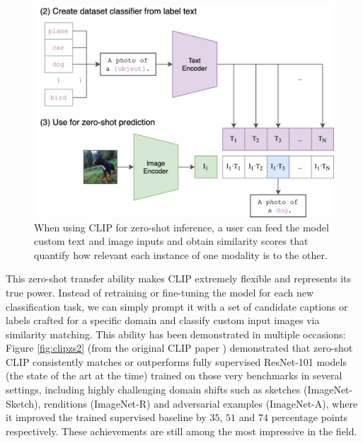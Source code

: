 \documentclass[a4paper, oneside, english]{sapthesis} %
\begin{document}
\begin{figure}[h]
    \centering
    \includegraphics[width=\textwidth]{img/CLIP-zero-shot.png}
    \caption{When using CLIP for zero-shot inference, a user can feed the model custom text and image inputs and obtain similarity scores that quantify how relevant each instance of one modality is to the other.}
    \label{fig:clipzs1}
\end{figure}

This zero-shot transfer ability makes CLIP extremely flexible and represents its true power. Instead of retraining or fine-tuning the model for each new classification task, we can simply prompt it with a set of candidate captions or labels crafted for a specific domain and classify custom input images via similarity matching. This ability has been demonstrated in multiple occasions: Figure \ref{fig:clipzs2} (from the original CLIP paper \cite{radford2021learning}) demonstrated that zero-shot CLIP consistently matches or outperforms fully supervised ResNet-101 models (the state of the art at the time) trained on those very benchmarks in several settings, including highly challenging domain shifts such as sketches (ImageNet-Sketch), renditions (ImageNet-R) and adversarial examples (ImageNet-A), where it improved the trained supervised baseline by $35$, $51$ and $74$ percentage points respectively. These achievements are still among the most impressive in the field.
\end{document}

